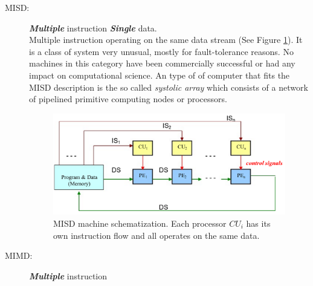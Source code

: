 \begin{description}
\item[MISD:] \textit{\textbf{Multiple}} instruction \textit{\textbf{Single}} data. \hfill \\ 
Multiple instruction operating on the same data stream  (See Figure \ref{fig:MISD}). It is a class of system very unusual, mostly for fault-tolerance reasons. No machines in this category have been commercially successful or had any impact on computational science. 
An type of of computer  that fits the MISD description is the so called \textit{systolic array} which consists of a network of pipelined primitive computing nodes or processors. 
\begin{figure}
	\centering
	\includegraphics[width=1.0\textwidth]{./images/parallel_programming/MISD}
	\caption{MISD machine schematization. Each processor $CU_i$ has its own instruction flow and all operates on the same data.}
	\label{fig:MISD}
\end{figure}
 
\item[MIMD:] \textit{\textbf{Multiple}} instruction


\end{description}
